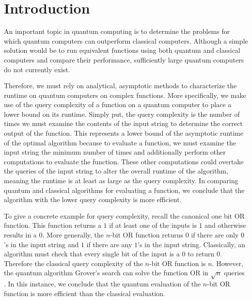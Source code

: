 \section{Introduction}

An important topic in quantum computing is
to determine the problems for which quantum
computers can outperform classical computers.
Although a simple solution would be to run equivalent functions using
both quantum and classical computers and compare their
performance, sufficiently large quantum computers do not
currently exist.

Therefore, we must rely on analytical, asymptotic methods
to characterize the runtime on quantum computers on
complex functions. More specifically, we make use of the
query complexity of a function on a quantum computer to
place a lower bound on its runtime. Simply put, the query
complexity is the number of times we must examine the
contents of the input string to determine the correct
output of the function. This represents a lower bound of
the asymptotic runtime of the optimal algorithm because to
evaluate a function, we must examine the input string the
minimum number of times and additionally perform other
computations to evaluate the function. These other
computations could overtake the queries of the input string
to alter the overall runtime of the algorithm, meaning the
runtime is at least as large as the query complexity. In comparing quantum and classical algorithms for evaluating a function, we conclude that the algorithm with the lower query complexity is more efficient.

To give a concrete example for query complexity,
recall the canonical one bit OR function. This function
returns a $1$ if at least one of the inputs is $1$ and
otherwise results in a $0$. More generally, the $n$-bit OR
function returns $0$ if there are only $0$'s in the input
string and $1$ if there are any $1$'s in the input string.
Classically, an algorithm must check that
every single bit of the input is a $0$ to return $0$.
Therefore the classical query complexity of the $n$-bit OR
function is $n$. However, the quantum algorithm Grover's
search can solve the function OR in $\sqrt{n}$ queries
\cite{grover1996fast}. In this instance, we conclude that
the quantum evaluation of the $n$-bit OR function is more
efficient than the classical evaluation.

